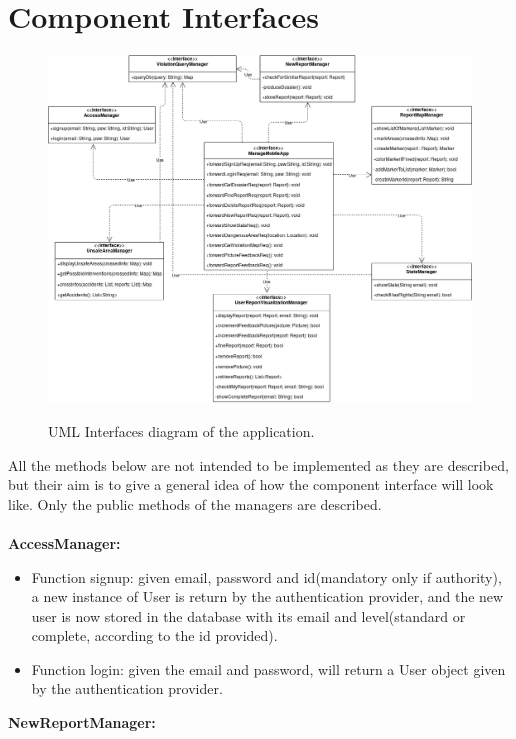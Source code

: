 \documentclass[../RASD.tex]{subfiles}
\begin{document}
    \section{Component Interfaces}\label{sec:component-interfaces}
    \begin{figure}[H]
        \centering
        \includegraphics[scale = 0.4]{assets/interfaces.png}\\[1.6 cm]
        \caption[\textit{UML Interfaces} Diagram]{UML Interfaces diagram of the application.}
    \end{figure}
    All the methods below are not intended to be implemented as they are described, but their aim is to give a general idea of how the component
    interface will look like.
    Only the public methods of the managers are described.
    \\
    \\
    \textbf{AccessManager:}
    \begin{itemize}
        \item Function signup: given email, password and id(mandatory only if authority), a new instance of User is return by the authentication provider,
        and the new user is now stored in the database with its email and level(standard or complete, according to the id provided).
        \item Function login: given the email and password, will return a User object given by the authentication provider.
    \end{itemize}
    \textbf{NewReportManager:}
\end{document}
